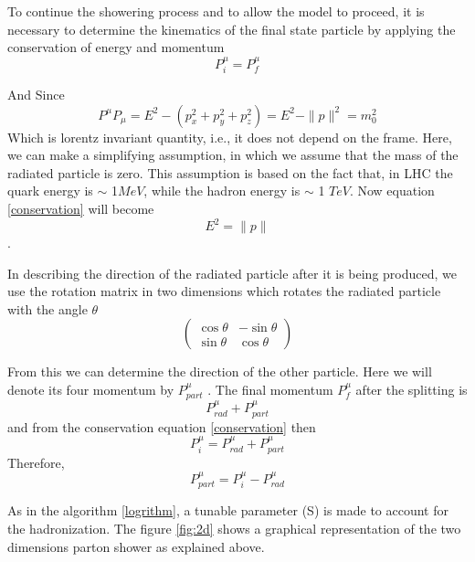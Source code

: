 To continue the showering process and to allow the model to proceed, it is necessary to determine the kinematics of the final state particle by applying the conservation of energy and momentum 
\begin{equation}
P_i^{\mu} = P_f^{\mu}
\label{conservation}\end{equation}

And Since \begin{equation}
  P^{\mu} P_{\mu} = E^2 - (p_x^2 + p_y^2 + p_z^2) = E^2 - \|p\|^2 = m_0^2
\end{equation}
Which is lorentz invariant quantity, i.e., it does not depend on the frame. Here, we can make a simplifying assumption, in which we assume that the mass of the radiated particle is zero. This assumption is based on the fact that, in LHC the quark energy is $\sim$ 1$\si{MeV}$,
while
the hadron energy is $\sim$ 1 $\si{TeV}$. Now equation \ref{conservation} will become \begin{equation}
E^2 = \|p\|
\label{important}\end{equation}\citep{Salam:2010zt}.    
  
In describing the direction of the radiated particle after it is being produced, we use the rotation matrix in two dimensions which rotates the radiated particle with the angle $\theta$ 
\begin{equation}
\begin{pmatrix}
\cos \theta & - \sin \theta\\
\sin \theta & \cos \theta
\end{pmatrix}
\end{equation}   

From this we can determine the direction of the other particle. Here we will denote its four momentum by $P_{part}^{\mu}$ . The final momentum  $P^{\mu}_{f}$ after the splitting is 
\begin{equation}
P_{rad}^{\mu} + P_{part}^{\mu}
\end{equation} and from the conservation equation \ref{conservation} then \begin{equation}
P^{\mu}_{i} = P_{rad}^{\mu} + P_{part}^{\mu}
\end{equation} Therefore, \begin{equation}
P_{part}^{\mu} = P^{\mu}_{i} - P_{rad}^{\mu} 
\end{equation}     

As in the algorithm \ref{logrithm},
a tunable parameter (S)
is made to account for the hadronization. The figure \ref{fig:2d} shows a graphical representation of the two dimensions parton shower as explained above.
     
